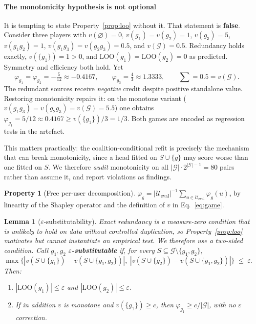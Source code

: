 \documentclass[pdflatex,sn-basic,Numbered]{sn-jnl}
\theoremstyle{plain}
\newtheorem{lemma}[theorem]{Lemma}
\theoremstyle{definition}
\newtheorem{property}{Property}
\newcommand{\G}{\mathcal{G}}
\newcommand{\Ueval}{\mathcal{U}_{\mathrm{eval}}}
\newcommand{\LOO}{\mathrm{LOO}}
\begin{document}
\paragraph{The monotonicity hypothesis is not optional}
It is tempting to state Property~\ref{prop:loo} without it. That statement is
\textbf{false}. Consider three players with $v(\varnothing)=0$,
$v(g_1)=v(g_2)=1$, $v(g_3)=5$, $v(g_1g_2)=1$, $v(g_1g_3)=v(g_2g_3)=0.5$, and
$v(\G)=0.5$. Redundancy holds exactly, $v(\{g_1\}) = 1 > 0$, and
$\LOO(g_1)=\LOO(g_2)=0$ as predicted. Symmetry and efficiency both hold. Yet
\[
\varphi_{g_1} = \varphi_{g_2} = -\tfrac{5}{12}\approx-0.4167,
\qquad \varphi_{g_3} = \tfrac43\approx1.3333,
\qquad \textstyle\sum = 0.5 = v(\G).
\]
The redundant sources receive \emph{negative} credit despite positive
standalone value. Restoring monotonicity repairs it: on the monotone variant
($v(g_1g_3)=v(g_2g_3)=v(\G)=5.5$) one obtains
$\varphi_{g_1} = 5/12\approx0.4167 \ge v(\{g_1\})/3 = 1/3$. Both games are encoded as
regression tests in the artefact.

This matters practically: the coalition-conditional refit is precisely the
mechanism that can break monotonicity, since a head fitted on $S \cup \{g\}$
may score worse than one fitted on $S$. We therefore \emph{audit} monotonicity
on all $|\G| \cdot 2^{|\G|-1} = 80$ pairs rather than assume it, and report
violations as findings.

\begin{property}[Free per-user decomposition]\label{prop:decomp}
$\varphi_g = |\Ueval|^{-1}\sum_{u\in\Ueval} \varphi_g(u)$, by linearity of the
Shapley operator and the definition of $v$ in Eq.~\eqref{eq:game}.
\end{property}

\begin{lemma}[$\varepsilon$-substitutability]\label{lem:eps}
Exact redundancy is a measure-zero condition that is unlikely to hold on data
without controlled duplication, so Property~\ref{prop:loo} motivates but cannot
instantiate an empirical test. We therefore use a \emph{two-sided} condition.
Call $g_1,g_2$ \textbf{$\varepsilon$-substitutable} if, for every
$S \subseteq \G\setminus\{g_1,g_2\}$,
\begin{equation}
\max\bigl\{
|v(S\cup\{g_1\}) - v(S\cup\{g_1,g_2\})|,\;
|v(S\cup\{g_2\}) - v(S\cup\{g_1,g_2\})|
\bigr\} \;\le\; \varepsilon .
\label{eq:epssub}
\end{equation}
Then:
\begin{enumerate}
\item[(i)] $|\LOO(g_1)| \le \varepsilon$ and $|\LOO(g_2)| \le \varepsilon$.
\item[(ii)] If in addition $v$ is monotone and $v(\{g_1\}) \ge c$, then
$\varphi_{g_1} \ge c/|\G|$, with no $\varepsilon$ correction.
\end{enumerate}
\end{lemma}
\end{document}
